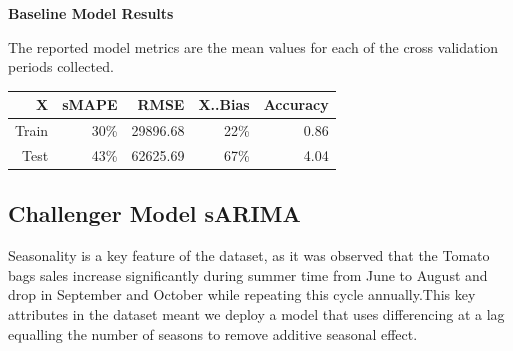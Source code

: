 \documentclass[12pt,oneside]{chicagocapstone}
\begin{document}
\textbf{Baseline Model Results}

The reported model metrics are the mean values for each of the cross
validation periods collected.
\begin{longtable}[]{@{}rrrrr@{}}
\toprule
X & sMAPE & RMSE & X..Bias & Accuracy\tabularnewline
\midrule
\endhead
Train & 30\% & 29896.68 & 22\% & 0.86\tabularnewline
Test & 43\% & 62625.69 & 67\% & 4.04\tabularnewline
\bottomrule
\end{longtable}
\subsection*{Challenger Model sARIMA}\label{challenger-model-sarima}

Seasonality is a key feature of the dataset, as it was observed that the
Tomato bags sales increase significantly during summer time from June to
August and drop in September and October while repeating this cycle
annually.This key attributes in the dataset meant we deploy a model that
uses differencing at a lag equalling the number of seasons to remove
additive seasonal effect.
\end{document}
